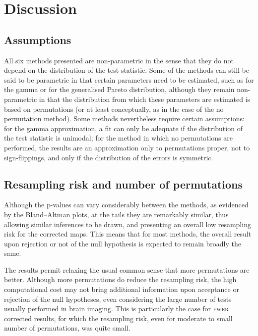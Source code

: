 \section{Discussion}
\label{sec:accel:discussion}

\subsection{Assumptions}

All six methods presented are non-parametric in the sense that they do not depend on the distribution of the test statistic. Some of the methods can still be said to be parametric in that certain parameters need to be estimated, such as for the gamma or for the generalised Pareto distribution, although they remain non-parametric in that the distribution from which these parameters are estimated is based on permutations (or at least conceptually, as in the case of the no permutation method). Some methods nevertheless require certain assumptions: for the gamma approximation, a fit can only be adequate if the distribution of the test statistic is unimodal; for the method in which no permutations are performed, the results are an approximation only to permutations proper, not to sign-flippings, and only if the distribution of the errors is symmetric.

\subsection{Resampling risk and number of permutations}

Although the p-values can vary considerably between the methods, as evidenced by the Bland--Altman plots, at the tails they are remarkably similar, thus allowing similar inferences to be drawn, and presenting an overall low resampling risk for the corrected maps. This means that for most methods, the overall result upon rejection or not of the null hypothesis is expected to remain broadly the same.

The results permit relaxing the usual common sense that more permutations are better. Although more permutations do reduce the resampling risk, the high computational cost may not bring additional information upon acceptance or rejection of the null hypotheses, even considering the large number of tests usually performed in brain imaging. This is particularly the case for \textsc{fwer} corrected results, for which the resampling risk, even for moderate to small number of permutations, was quite small.


